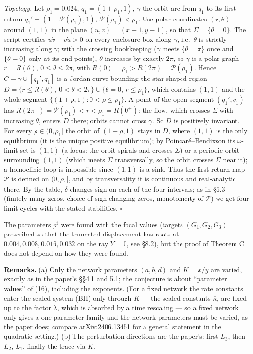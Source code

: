 \documentclass[11pt,a4paper]{report}
\begin{document}
\emph{Topology.} Let \(\rho_1=0.024\), \(q_1=(1+\rho_1,1)\), \(\gamma\) the orbit arc from \(q_1\) to its first return
\(q_1'=(1+\mathcal P(\rho_1),1)\), \(\mathcal P(\rho_1)<\rho_1\). Use polar coordinates \((r,\theta)\) around
\((1,1)\) in the plane \((u,v)=(x-1,y-1)\), so that \(\Sigma=\{\theta=0\}\). The script certifies
\(u\dot v-v\dot u>0\) on every enclosure box along \(\gamma\), i.e.~\(\theta\) is strictly increasing along
\(\gamma\); with the crossing bookkeeping (\(\gamma\) meets \(\{\theta=\pi\}\) once and \(\{\theta=0\}\) only at its
end points), \(\theta\) increases by exactly \(2\pi\), so \(\gamma\) is a polar graph \(r=R(\theta)\),
\(0\le\theta\le2\pi\), with \(R(0)=\rho_1>R(2\pi)=\mathcal P(\rho_1)\). Hence \(C=\gamma\cup[q_1',q_1]\) is a Jordan
curve bounding the star-shaped region \(D=\{r\le R(\theta),\ 0<\theta<2\pi\}\cup\{\theta=0,\ r\le\rho_1\}\),
which contains \((1,1)\) and the whole segment \(\{(1+\rho,1):0<\rho\le\rho_1\}\). A point of the open segment
\((q_1',q_1)\) has \(R(2\pi^-)=\mathcal P(\rho_1)<r<\rho_1=R(0^+)\): the flow, which crosses \(\Sigma\) with
increasing \(\theta\), enters \(D\) there; orbits cannot cross \(\gamma\). So \(D\) is positively invariant. For every
\(\rho\in(0,\rho_1]\) the orbit of \((1+\rho,1)\) stays in \(D\), where \((1,1)\) is the only equilibrium (it is
the unique positive equilibrium); by Poincaré--Bendixson its \(\omega\)-limit set is \((1,1)\) (a focus: the orbit
spirals and crosses \(\Sigma\)) or a periodic orbit surrounding \((1,1)\) (which meets \(\Sigma\) transversally, so
the orbit crosses \(\Sigma\) near it); a homoclinic loop is impossible since \((1,1)\) is a sink. Thus the first
return map \(\mathcal P\) is defined on \((0,\rho_1]\), and by transversality it is continuous and real-analytic
there. By the table, \(\delta\) changes sign on each of the four intervals; as in §6.3 (finitely many zeros,
choice of sign-changing zeros, monotonicity of \(\mathcal P\)) we get four limit cycles with the stated
stabilities. \(\square\)

The parameters \(p^\sharp\) were found with the focal values (targets
\((G_1,G_2,G_3)\) prescribed so that the truncated displacement has roots at \(0.004,0.008,0.016,0.032\) on the
ray \(Y=0\), see §8.2), but the proof of Theorem C does not depend on how they were found.

\textbf{Remarks.} (a) Only the network parameters \((a,b,d)\) and \(K=\bar x/\bar y\) are varied, exactly as in the
paper's §§4.1 and 5.1; the conjecture is about ``parameter values'' of (16), including the exponents. (For a
fixed network the rate constants enter the scaled system (BH) only through \(K\) --- the scaled constants
\(\overline\kappa_i\) are fixed up to the factor \(\lambda\), which is absorbed by a time rescaling --- so a fixed
network only gives a one-parameter family and the network parameters must be varied, as the paper does; compare
arXiv:2406.13451 for a general statement in the quadratic setting.) (b) The perturbation
directions are the paper's: first \(L_3\), then \(L_2\), \(L_1\), finally the trace via \(K\).
\end{document}
